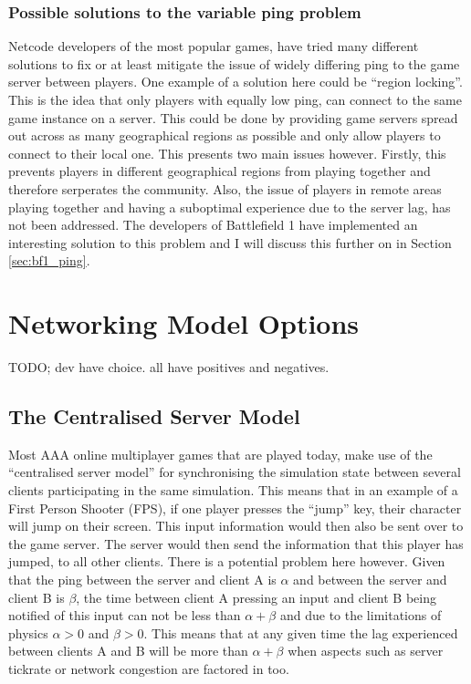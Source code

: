 \subsubsection{Possible solutions to the variable ping problem}
Netcode developers of the most popular games, have tried many different solutions to fix or at least mitigate the issue of widely differing ping to the game server between players. One example of a solution here could be ``region locking''. This is the idea that only players with equally low ping, can connect to the same game instance on a server. This could be done by providing game servers spread out across as many geographical regions as possible and only allow players to connect to their local one. This presents two main issues however. Firstly, this prevents players in different geographical regions from playing together and therefore serperates the community. Also, the issue of players in remote areas playing together and having a suboptimal experience due to the server lag, has not been addressed. The developers of Battlefield 1 have implemented an interesting solution to this problem and I will discuss this further on in Section \ref{sec:bf1_ping}.


\newpage
\section{Networking Model Options}
TODO; dev have choice. all have positives and negatives.


\subsection{The Centralised Server Model}
Most AAA online multiplayer games that are played today, make use of the ``centralised server model'' for synchronising the simulation state between several clients participating in the same simulation. This means that in an example of a First Person Shooter (FPS), if one player presses the ``jump'' key, their character will jump on their screen. This input information would then also be sent over to the game server. The server would then send the information that this player has jumped, to all other clients. There is a potential problem here however. Given that the ping between the server and client A is \(\alpha\) and between the server and client B is \(\beta\), the time between client A pressing an input and client B being notified of this input can not be less than $\alpha+\beta$ and due to the limitations of physics $\alpha>0$ and $\beta>0$. This means that at any given time the lag experienced between clients A and B will be more than $\alpha+\beta$ when aspects such as server tickrate or network congestion are factored in too.

